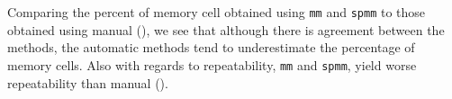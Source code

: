 Comparing the percent of memory cell obtained using \texttt{mm} and \texttt{spmm} to those obtained using manual (), we see that
although there is agreement between the methods, the automatic methods tend to underestimate the percentage of memory cells.
Also with regards to repeatability, \texttt{mm} and \texttt{spmm}, yield worse repeatability than manual ().
